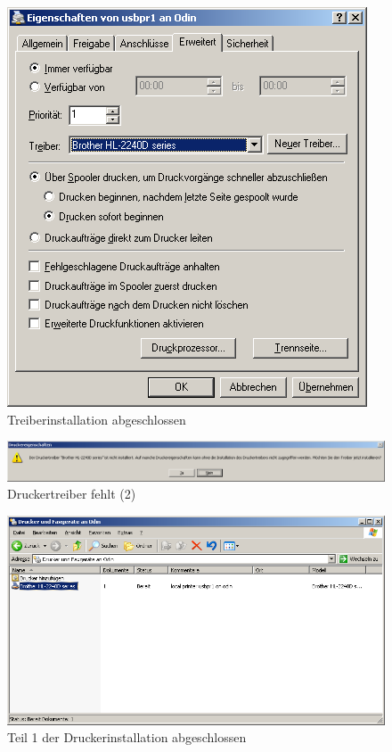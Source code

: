 \begin{figure}[hbt!]
\centering
\includegraphics[width=\columnwidth]{image015}
\caption{Treiberinstallation abgeschlossen}
\label{fig:sambalpd:setup-completed}
\end{figure}

\begin{figure}[hbt!]
\centering
\includegraphics[width=\columnwidth]{image016}
\caption{Druckertreiber fehlt (2)}
\label{fig:sambalpd:no-driver:2}
\end{figure}

\begin{figure}[hbt!]
\centering
\includegraphics[width=0.8\columnwidth]{image017}
\caption{Teil 1 der Druckerinstallation abgeschlossen}
\label{fig:sambalpd:installed}
\end{figure}

